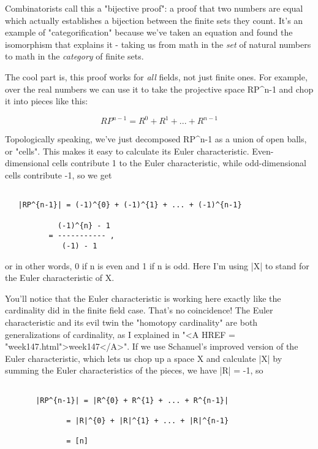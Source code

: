 Combinatorists call this a "bijective proof": a proof that two
numbers are equal which actually establishes a bijection between the
finite sets they count.  It's an example of "categorification"
because we've taken an equation and found the isomorphism that explains
it - taking us from math in the \emph{set} of natural numbers to math in the
\emph{category} of finite sets.

The cool part is, this proof works for \emph{all} fields, not just finite
ones.  For example, over the real numbers we can use it to take the
projective space RP^{n-1} and chop it into pieces like this:


$$

    RP^{n-1} = R^{0} + R^{1} + ... + R^{n-1} 
$$
    

Topologically speaking, we've just decomposed RP^{n-1} as a
union of open balls, or "cells".  This makes it easy to
calculate its Euler characteristic.  Even-dimensional cells contribute 1
to the Euler characteristic, while odd-dimensional cells contribute -1,
so we get


\begin{verbatim}

   |RP^{n-1}| = (-1)^{0} + (-1)^{1} + ... + (-1)^{n-1} 

            (-1)^{n} - 1
          = ----------- ,
             (-1) - 1              
\end{verbatim}
    
or in other words, 0 if n is even and 1 if n is odd.  Here I'm using |X|
to stand for the Euler characteristic of X.

You'll notice that the Euler characteristic is working here exactly like
the cardinality did in the finite field case.  That's no coincidence!
The Euler characteristic and its evil twin the "homotopy
cardinality" are both generalizations of cardinality, as I
explained in "<A HREF = "week147.html">week147</A>".  If we
use Schanuel's improved version of the Euler characteristic, which lets
us chop up a space X and calculate |X| by summing the Euler
characteristics of the pieces, we have |R| = -1, so


\begin{verbatim}

       |RP^{n-1}| = |R^{0} + R^{1} + ... + R^{n-1}|

              = |R|^{0} + |R|^{1} + ... + |R|^{n-1}

              = [n]
\end{verbatim}
    
